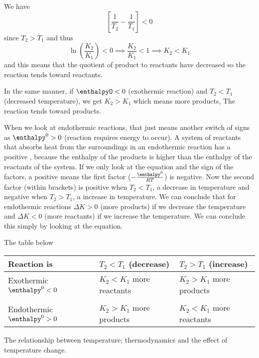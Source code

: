\documentclass[../mit-general-chemistry.tex]{subfiles}
\begin{document}
We have
\begin{equation*}
  \left[\frac{1}{T_2} - \frac{1}{T_1}\right] < 0
\end{equation*}
since $T_2 > T_1$ and thus
\begin{equation*}
  \ln\left(\frac{K_2}{K_1}\right) < 0
  \implies \frac{K_2}{K_1} < 1
  \implies K_2 < K_1
\end{equation*}
and this means that the quotient of product to reactants have
decreased so the reaction tends toward reactants.

In the same manner, if $\enthalpyO < 0$ (exothermic reaction) and $T_2
< T_1$ (decreased temperature), we get $K_2 > K_1$ which means more
products, The reaction tends toward products.

When we look at endothermic reactions, that just means another switch
of signs as $\enthalpy^0 > 0$ (reaction requires energy to occur). A
system of reactants that absorbs heat from the surroundings in an
endothermic reaction has a positive \enthalpy, because the enthalpy of
the products is higher than the enthalpy of the reactants of the
system. If we only look at the equation and the sign of the factors, a
positive \enthalpy means the first factor ($-\frac{\enthalpy^0}{RT}$)
is negative. Now the second factor (within brackets) is positive when
$T_2 < T_1$, a decrease in temperature and negative when $T_2 > T_1$,
a increase in temperature. We can conclude that for endothermic reactions
$\Delta K > 0$ (more products) if we decrease the temperature and
$\Delta K < 0$ (more reactants) if we increase the temperature. We can
conclude this simply by looking at the equation.

The table below 
\begin{htable}
  \begin{center}
    \begin{tabularx}{.8\textwidth}{XXX}
      \toprule
      Reaction is & \specialcell{$T_2 < T_1$\\ (decrease)} & \specialcell{$T_2 > T_1$\\ (increase)} \\
      \midrule
      \specialcell{Exothermic\\ $\enthalpy^0 < 0$} &
      \specialcell{$K_2 < K_1$\\ more reactants} &
      \specialcell{$K_2 > K_1$\\ more products} \\
      \\
      \specialcell{Endothermic\\ $\enthalpy^0 > 0$} &
      \specialcell{$K_2 > K_1$\\ more products} &
      \specialcell{$K_2 < K_1$\\ more reactants} \\
      \bottomrule
    \end{tabularx}
  \end{center}
  \caption{The relationship between temperature; thermodynamics and
    the effect of temperature change.}
\end{htable}
\end{document}
